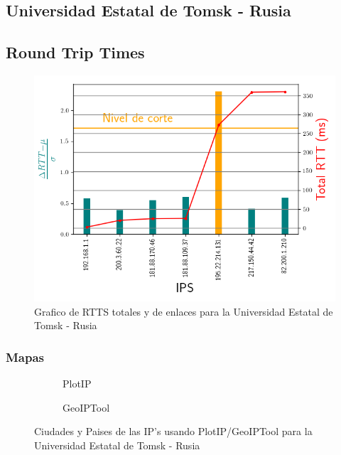 \subsection{Universidad Estatal de Tomsk - Rusia}

\subsection{Round Trip Times}

\begin{figure}[ht]
	\begin{center}
		\includegraphics[width=0.8\columnwidth]{imagenes/rtts_tsu.png}
		\caption{Grafico de RTTS totales y de enlaces para la Universidad Estatal de Tomsk - Rusia}
	\end{center}
\end{figure}

\subsubsection{Mapas}

\begin{figure}[ht]
	\begin{subfigure}[b]{0.5\textwidth}
		\centering
		
		\caption{PlotIP}
	\end{subfigure}
	\begin{subfigure}[b]{0.5\textwidth}
		\centering
		
		\caption{GeoIPTool}
	\end{subfigure}
	\caption{Ciudades y Paises de las IP's usando PlotIP/GeoIPTool para la Universidad Estatal de Tomsk - Rusia}
\end{figure}

